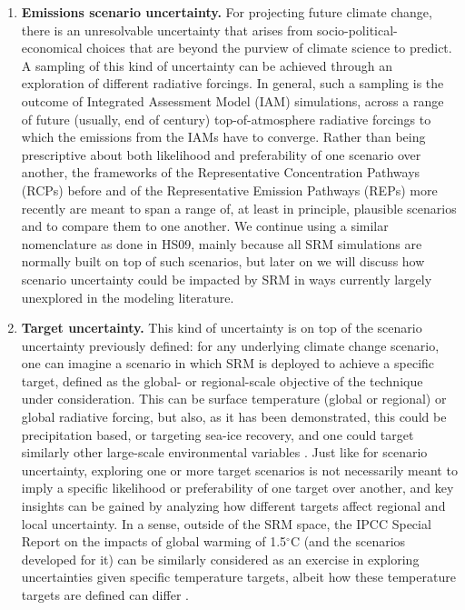 \documentclass[draft]{agujournal2019}
\begin{document}
\begin{enumerate}
    \item \textbf{Emissions scenario uncertainty.} For projecting future climate change, there is an unresolvable uncertainty that arises from socio-political-economical choices that are beyond the purview of climate science to predict. A sampling of this kind of uncertainty can be achieved through an exploration of different radiative forcings. In general, such a sampling is the outcome of Integrated Assessment Model (IAM) simulations, across a range of future (usually, end of century) top-of-atmosphere radiative forcings to which the emissions from the IAMs have to converge. Rather than being prescriptive about both likelihood and preferability of one scenario over another, the frameworks of the Representative Concentration Pathways (RCPs) before and of the Representative Emission Pathways (REPs) more recently are meant to span a range of, at least in principle, plausible scenarios and to compare them to one another. We continue using a similar nomenclature as done in HS09, mainly because all SRM simulations are normally built on top of such scenarios, but later on we will discuss how scenario uncertainty could be impacted by SRM in ways currently largely unexplored in the modeling literature.

    \item \textbf{Target uncertainty.} This kind of uncertainty is on top of the scenario uncertainty previously defined: for any underlying climate change scenario, one can imagine a scenario in which SRM is deployed to achieve a specific target, defined as the global- or regional-scale objective of the technique under consideration. This can be surface temperature (global or regional) or global radiative forcing, but also, as it has been demonstrated, this could be precipitation based, or targeting sea-ice recovery, and one could target similarly other large-scale environmental variables \cite{Lee-etal-2020}. Just like for scenario uncertainty, exploring one or more target scenarios is not necessarily meant to imply a specific likelihood or preferability of one target over another, and key insights can be gained by analyzing how different targets affect regional and local uncertainty. In a sense, outside of the SRM space, the IPCC Special Report on the impacts of global warming of 1.5$^{\circ}$C \cite{IPCC_2018_SR15} (and the scenarios developed for it) can be similarly considered as an exercise in exploring uncertainties given specific temperature targets, albeit how these temperature targets are defined can differ \cite{schleussner2016differential,Visioni2023}.


\end{enumerate}
\end{document}
